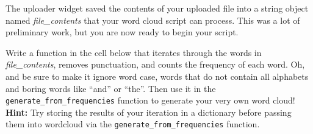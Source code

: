 \documentclass[11pt]{article}
\begin{document}
    The uploader widget saved the contents of your uploaded file into a
string object named \emph{file\_contents} that your word cloud script
can process. This was a lot of preliminary work, but you are now ready
to begin your script.

    Write a function in the cell below that iterates through the words in
\emph{file\_contents}, removes punctuation, and counts the frequency of
each word. Oh, and be sure to make it ignore word case, words that do
not contain all alphabets and boring words like ``and'' or ``the''. Then
use it in the \texttt{generate\_from\_frequencies} function to generate
your very own word cloud! \textbf{Hint:} Try storing the results of your
iteration in a dictionary before passing them into wordcloud via the
\texttt{generate\_from\_frequencies} function.
\end{document}
